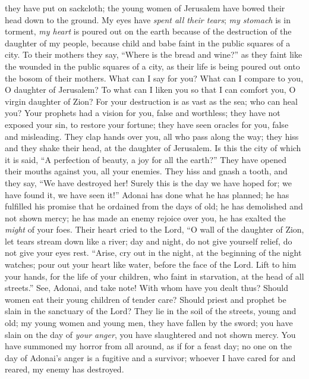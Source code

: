 \begin{biblechapter}
they have put on sackcloth; 
the young women of Jerusalem 
have bowed their head down to the ground.
\verse My eyes have \textit{spent all their tears}; 
\textit{my stomach} is in torment, 
\textit{my heart} is poured out on the earth 
because of the destruction of the daughter of my people, 
because child and babe faint 
in the public squares of a city.
\verse To their mothers they say, 
“Where is the bread and wine?” 
as they faint like the wounded 
in the public squares of a city, 
as their life is being poured out 
onto the bosom of their mothers.
\verse What can I say for you? What can I compare to you, 
O daughter of Jerusalem? 
To what can I liken you so that I can comfort you, 
O virgin daughter of Zion? 
For your destruction is as vast as the sea; 
who can heal you?
\verse Your prophets had a vision for you, 
false and worthless; 
they have not exposed your sin, 
to restore your fortune; 
they have seen oracles for you, 
false and misleading.
\verse They clap hands over you, 
all who pass along the way; 
they hiss and they shake their head, 
at the daughter of Jerusalem. 
Is this the city of which it is said, 
“A perfection of beauty, a joy for all the earth?”
\verse They have opened their mouths against you, 
all your enemies. 
They hiss and gnash a tooth, 
and they say, “We have destroyed her! 
Surely this is the day we have hoped for; 
we have found it, we have seen it!”
\verse Adonai has done what he has planned; 
he has fulfilled his promise 
that he ordained from the days of old; 
he has demolished and not shown mercy; 
he has made an enemy rejoice over you, 
he has exalted the \textit{might} of your foes.
\verse Their heart cried to the Lord, 
“O wall of the daughter of Zion, 
let tears stream down like a river; 
day and night, 
do not give yourself relief, 
do not give your eyes rest.
\verse “Arise, cry out in the night, 
at the beginning of the night watches; 
pour out your heart like water, 
before the face of the Lord. 
Lift to him your hands, 
for the life of your children, 
who faint in starvation, 
at the head of all streets.”
\verse See, Adonai, and take note! 
With whom have you dealt thus? 
Should women eat their young 
children of tender care? 
Should priest and prophet be slain 
in the sanctuary of the Lord?
\verse They lie in the soil of the streets, 
young and old; 
my young women and young men, 
they have fallen by the sword; 
you have slain on the day of \textit{your anger}, 
you have slaughtered and not shown mercy.
\verse You have summoned my horror from all around, 
as if for a feast day; 
no one on the day of Adonai’s anger 
is a fugitive and a survivor; 
whoever I have cared for and reared, 
my enemy has destroyed.
\end{biblechapter}

